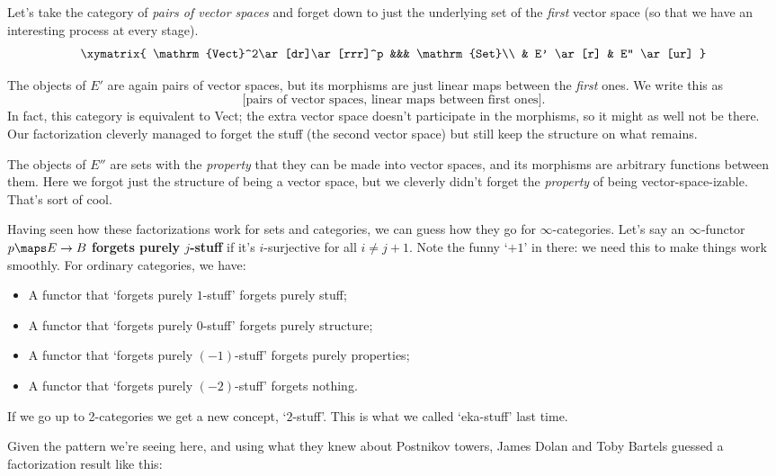 \documentclass[12pt]{amsart}
\begin{document}
\begin{eg}
  Let's take the category of \emph{pairs of vector spaces} and forget
  down to just the underlying set of the \emph{first} vector space (so
  that we have an interesting process at every stage).
  \[\xymatrix{
    \mathrm{Vect}^2\ar[dr]\ar[rrr]^p &&& \mathrm{Set}\\
    & E' \ar[r] & E'' \ar[ur]
  }\]

  The objects of $E'$ are again pairs of vector spaces, but its
  morphisms are just linear maps between the \emph{first} ones.  We
  write this as 
  \[
  \big[\text{pairs of vector spaces, linear maps between first ones}\big].
  \]
  In fact, this category is equivalent to Vect; the extra vector space
  doesn't participate in the morphisms, so it might as well not be
  there.  Our factorization cleverly managed to forget the stuff (the
  second vector space) but still keep the structure on what remains.

  The objects of $E''$ are sets with the \emph{property} that they can
  be made into vector spaces, and its morphisms are arbitrary
  functions between them.  Here we forgot just the structure of being
  a vector space, but we cleverly didn't forget the \emph{property} of
  being vector-space-izable.  That's sort of cool.
\end{eg}

Having seen how these factorizations work for sets and categories,
we can guess how they go for $\infty$-categories.  Let's say an 
$\infty$-functor $p \maps E \to B$ {\bf forgets purely $j$-stuff}
if it's $i$-surjective for all $i \ne j+1$.
Note the funny `$+1$' in there: we need this to make things
work smoothly.  For ordinary categories, we have:
\begin{itemize}
\item A functor that `forgets purely $1$-stuff' forgets purely stuff;
\item A functor that `forgets purely $0$-stuff' forgets purely structure;
\item A functor that `forgets purely $(-1)$-stuff' forgets purely properties;
\item A functor that `forgets purely $(-2)$-stuff' forgets nothing.
\end{itemize}
If we go up to 2-categories we get a new concept, `$2$-stuff'.   This 
is what we called `eka-stuff' last time.

Given the pattern we're seeing here, and using what
they knew about Postnikov towers, James Dolan and Toby Bartels
guessed a factorization result like this:
\end{document}
